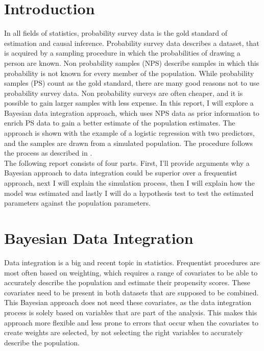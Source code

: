\documentclass[10.5pt]{article}
\begin{document}
\section{Introduction}
In all fields of statistics, probability survey data is the gold standard of estimation and causal inference. Probability survey data describes a dataset, that is acquired by a sampling procedure in which the probabilities of drawing a person are known. Non probability samples (NPS) describe samples in which this probability is not known for every member of the population. While probability samples (PS) count as the gold standard, there are many good reasons not to use probability survey data. Non probability surveys are often cheaper, and it is possible to gain larger samples with less expense. In this report, I will explore a Bayesian data integration approach, which uses NPS data as prior information to enrich PS data to gain a better estimate of the population estimates. The approach is shown with the example of a logistic regression with two predictors, and the samples are drawn from a simulated population. The procedure follows the process as described in \cite{salvatore2024bayesian}. \\
The following report consists of four parts. First, I'll provide arguments why a Bayesian approach to data integration could be superior over a frequentist approach, next I will explain the simulation process, then I will explain how the model was estimated and lastly I will do a hypothesis test to test the estimated parameters against the population parameters. 

\section{Bayesian Data Integration}
Data integration is a big and recent topic in statistics. Frequentist procedures are most often based on weighting, which requires a range of covariates to be able to accurately describe the population and estimate their propensity scores. These covariates need to be present in both datasets that are supposed to be combined. This Bayesian approach does not need these covariates, as the data integration process is solely based on variables that are part of the analysis. This makes this approach more flexible and less prone to errors that occur when the covariates to create weights are selected, by not selecting the right variables to accurately describe the population.
\end{document}
